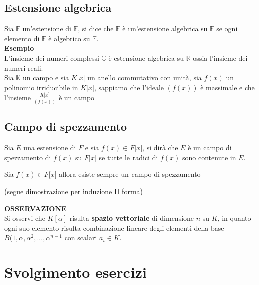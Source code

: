 \begin{flushleft}
\subsection{Estensione algebrica}
Sia $\mathbb{E}$ un'estensione di $\mathbb{F}$, si dice che $\mathbb{E}$ è un'estensione algebrica su $\mathbb{F}$ se ogni elemento di $\mathbb{E}$ è algebrico su $\mathbb{F}$.\\
\vspace{10px}
\textbf{Esempio}\\
\vspace{10px}
L'insieme dei numeri complessi $\mathbb{C}$ è estensione algebrica su $\mathbb{R}$ ossia l'insieme dei numeri reali.\\
Sia $\mathbb{K}$ un campo e sia $K\big[x\big]$ un anello commutativo con unità, sia $f(x)$ un polinomio irriducibile in $K\big[x\big]$, sappiamo che l'ideale $(f(x))$ è massimale e che l'insieme $\frac{K\big[x\big]}{(f(x))}$ è un campo



\subsection{Campo di spezzamento}
Sia $E$ una estensione di $F$ e sia $f(x)\in F\big[x\big]$, si dirà che $E$ è un campo di spezzamento di $f(x)$ su $F\big[x\big]$ se tutte le radici di $f(x)$ sono contenute in $E$.\\

\begin{proprieta}
Sia $f(x)\in F\big[x\big]$ allora esiste sempre un campo di spezzamento
\end{proprieta}
(segue dimostrazione per induzione II forma)
\\ \vspace{300px}














\textbf{OSSERVAZIONE}\\
Si osservi che $K[\alpha]$ risulta \textbf{spazio vettoriale} di dimensione $n$ su $K$, in quanto ogni suo elemento risulta combinazione lineare degli elementi della base $B(1, \alpha, \alpha^2,...,\alpha^{n-1}$ con scalari $a_i \in K$.





\section{Svolgimento esercizi}


\end{flushleft}
